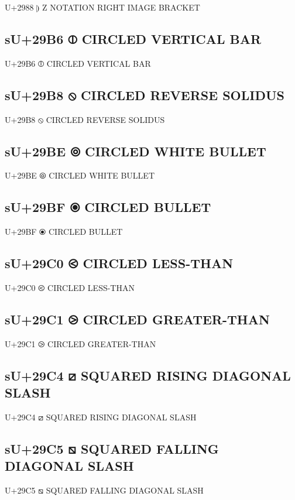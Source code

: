 U+2988 ⦈ Z NOTATION RIGHT IMAGE BRACKET

\subsection{sU+29B6 ⦶ CIRCLED VERTICAL BAR}

U+29B6 ⦶ CIRCLED VERTICAL BAR

\subsection{sU+29B8 ⦸ CIRCLED REVERSE SOLIDUS}

U+29B8 ⦸ CIRCLED REVERSE SOLIDUS

\subsection{sU+29BE ⦾ CIRCLED WHITE BULLET}

U+29BE ⦾ CIRCLED WHITE BULLET

\subsection{sU+29BF ⦿ CIRCLED BULLET}

U+29BF ⦿ CIRCLED BULLET

\subsection{sU+29C0 ⧀ CIRCLED LESS-THAN}

U+29C0 ⧀ CIRCLED LESS-THAN

\subsection{sU+29C1 ⧁ CIRCLED GREATER-THAN}

U+29C1 ⧁ CIRCLED GREATER-THAN

\subsection{sU+29C4 ⧄ SQUARED RISING DIAGONAL SLASH}

U+29C4 ⧄ SQUARED RISING DIAGONAL SLASH

\subsection{sU+29C5 ⧅ SQUARED FALLING DIAGONAL SLASH}

U+29C5 ⧅ SQUARED FALLING DIAGONAL SLASH

